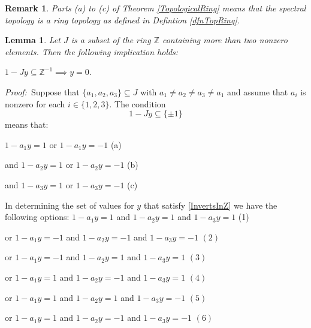 \documentclass[12pt, oneside]{book}
\newtheorem{lemma}[theorem]{Lemma}
\newtheorem{remark}[theorem]{Remark}
\newcommand{\proof}{{\noindent \it Proof:~}}
\begin{document}
\begin{remark}
\normalfont
Parts (a) to (c) of Theorem \ref{TopologicalRing} means that the spectral topology is a ring topology as defined in Defintion \ref{dfnTopRing}.
\end{remark}

\begin{lemma} \label{MoreThan2}
\normalfont
\noindent 
Let $J$ is a subset of the ring $\mathbb{Z}$ containing more than two nonzero elements. 
Then the following implication holds: 
\begin{center}
$1-Jy \subseteq \mathbb{Z}^{-1} \implies y=0$.
\end{center}
\end{lemma}

\proof \space Suppose that $\{ a_1, a_2, a_3 \} \subseteq J$ with $a_1 \not = a_2 \not = a_3 \not = a_1$ and assume that $a_i$ is nonzero for each $i \in \{1,2,3\}$. The condition 
\begin{equation} \label{InvertsInZ}
1-Jy \subseteq \{ \pm 1 \}
\end{equation}
means that:

\medskip \qquad \qquad \quad \qquad \quad $1-a_1y=1$ \qquad \quad or \quad \qquad $1-a_1y=-1$ \hfill 
(a)

\smallskip \qquad \quad and \qquad \quad $1-a_2y=1$ \qquad \quad or \quad \qquad $1-a_2y=-1$ \hfill 
(b)

\smallskip \qquad \quad and \qquad \quad $1-a_3y=1$ \qquad \quad or \quad \qquad $1-a_3y=-1$ \hfill 
(c)

\vskip 0.3cm

\noindent In determining the set of values for $y$ that satisfy \eqref{InvertsInZ} we have the 
following options:
\vskip 0.3cm \qquad \space $1-a_1y=1$ \qquad and \qquad $1-a_2y=1$ \qquad and \qquad $1-a_3y=1$ \hfill (1)

\vskip 0.3cm or \quad $1-a_1y=-1$ \quad \space and \qquad $1-a_2y=-1$ \quad and \qquad $1-a_3y=-1$ \hfill $(2)$

\vskip 0.3cm or \quad $1-a_1y=-1$ \qquad and \qquad $1-a_2y=1$ \qquad and \qquad $1-a_3y=1$ \hfill $(3)$

\vskip 0.3cm or \quad $1-a_1y=1$ \qquad and \qquad $1-a_2y=-1$ \quad \space and \qquad $1-a_3y=1$ \hfill $(4)$

\vskip 0.3cm or \quad $1-a_1y=1$ \qquad and \qquad $1-a_2y=1$ \qquad and \qquad $1-a_3y=-1$ \hfill $(5)$

\vskip 0.3cm or \quad $1-a_1y=1$ \qquad and \qquad $1-a_2y=-1$ \quad \space and \qquad $1-a_3y=-1$ \hfill $(6)$
\end{document}
